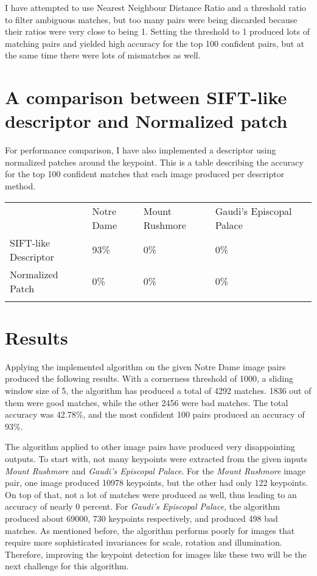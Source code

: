 I have attempted to use Nearest Neighbour Distance Ratio and a threshold ratio to filter ambiguous matches, but too many pairs were being discarded because their ratios were very close to being 1. Setting the threshold to 1 produced lots of matching pairs and yielded high accuracy for the top 100 confident pairs, but at the same time there were lots of mismatches as well.

\section*{A comparison between SIFT-like descriptor and Normalized patch}
For performance comparison, I have also implemented a descriptor using normalized patches around the keypoint. This is a table describing the accuracy for the top 100 confident matches that each image produced per descriptor method.
\begin{table}[]
    \begin{tabular}{lllll}
                         & Notre Dame & Mount Rushmore & Gaudi's Episcopal Palace &  \\
    SIFT-like Descriptor & 93\%       & 0\%            & 0\%                      &  \\
    Normalized Patch     & 0\%        & 0\%            & 0\%                      &  \\
                         &            &                &                          &
    \end{tabular}
\end{table}

\section*{Results}
Applying the implemented algorithm on the given Notre Dame image pairs produced the following results. With a cornerness threshold of 1000, a sliding window size of 5, the algorithm has produced a total of 4292 matches. 1836 out of them were good matches, while the other 2456 were bad matches. The total accuracy was 42.78\%, and the most confident 100 pairs produced an accuracy of 93\%.

The algorithm applied to other image pairs have produced very disappointing outputs. To start with, not many keypoints were extracted from the given inputs \emph{Mount Rushmore} and \emph{Gaudi's Episcopal Palace}. For the \emph{Mount Rushmore} image pair, one image produced 10978 keypoints, but the other had only 122 keypoints. On top of that, not a lot of matches were produced as well, thus leading to an accuracy of nearly 0 percent. For \emph{Gaudi's Episcopal Palace}, the algorithm produced about 69000, 730 keypoints respectively, and produced 498 bad matches. As mentioned before, the algorithm performs poorly for images that require more sophisticated invariances for scale, rotation and illumination. Therefore, improving the keypoint detection for images like these two will be the next challenge for this algorithm.


